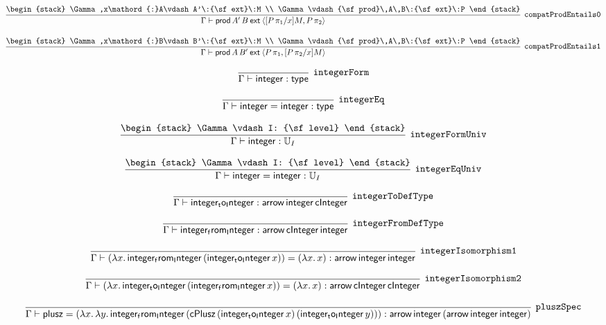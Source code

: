 \[
\infer[{\tt compatProdEntails0}]{\Gamma \vdash {\sf prod}\,A'\,B\:{\sf ext}\:\langle [P\, \pi_1/x]M,P\, \pi_2\rangle }{
\begin{stack}
\Gamma ,x\mathord{:}A\vdash A'\:{\sf ext}\:M
\\
\Gamma \vdash {\sf prod}\,A\,B\:{\sf ext}\:P
\end{stack}}
\]

\[
\infer[{\tt compatProdEntails1}]{\Gamma \vdash {\sf prod}\,A\,B'\:{\sf ext}\:\langle P\, \pi_1,[P\, \pi_2/x]M\rangle }{
\begin{stack}
\Gamma ,x\mathord{:}B\vdash B'\:{\sf ext}\:M
\\
\Gamma \vdash {\sf prod}\,A\,B\:{\sf ext}\:P
\end{stack}}
\]

\[
\infer[{\tt integerForm}]{\Gamma \vdash {\sf integer}: {\sf type}}{}
\]

\[
\infer[{\tt integerEq}]{\Gamma \vdash {\sf integer}= {\sf integer}: {\sf type}}{}
\]

\[
\infer[{\tt integerFormUniv}]{\Gamma \vdash {\sf integer}: {\Bbb U}_{I}}{
\begin{stack}
\Gamma \vdash I: {\sf level}
\end{stack}}
\]

\[
\infer[{\tt integerEqUniv}]{\Gamma \vdash {\sf integer}= {\sf integer}: {\Bbb U}_{I}}{
\begin{stack}
\Gamma \vdash I: {\sf level}
\end{stack}}
\]

\[
\infer[{\tt integerToDefType}]{\Gamma \vdash {\sf integer_to_Integer}: {\sf arrow}\,{\sf integer}\,{\sf cInteger}}{}
\]

\[
\infer[{\tt integerFromDefType}]{\Gamma \vdash {\sf integer_from_Integer}: {\sf arrow}\,{\sf cInteger}\,{\sf integer}}{}
\]

\[
\infer[{\tt integerIsomorphism1}]{\Gamma \vdash (\lambda x.\,{\sf integer_from_Integer}\,({\sf integer_to_Integer}\,x))= (\lambda x.\,x): {\sf arrow}\,{\sf integer}\,{\sf integer}}{}
\]

\[
\infer[{\tt integerIsomorphism2}]{\Gamma \vdash (\lambda x.\,{\sf integer_to_Integer}\,({\sf integer_from_Integer}\,x))= (\lambda x.\,x): {\sf arrow}\,{\sf cInteger}\,{\sf cInteger}}{}
\]

\[
\infer[{\tt pluszSpec}]{\Gamma \vdash {\sf plusz}= (\lambda x.\,\lambda y.\,{\sf integer_from_Integer}\,({\sf cPlusz}\,({\sf integer_to_Integer}\,x)\,({\sf integer_to_Integer}\,y))): {\sf arrow}\,{\sf integer}\,({\sf arrow}\,{\sf integer}\,{\sf integer})}{}
\]

